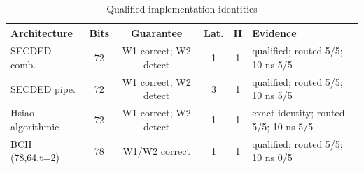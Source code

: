 \begin{table}[t]
\caption{Qualified implementation identities}
\label{tab:identities}
\centering
\scriptsize
\setlength{\tabcolsep}{5.0pt}
\begin{tabular}{@{}lccccp{7.2cm}@{}}
\toprule
Architecture & Bits & Guarantee & Lat. & II & Evidence \\
\midrule
SECDED comb. & 72 & W1 correct; W2 detect & 1 & 1 & qualified; routed 5/5; 10 ns 5/5 \\
SECDED pipe. & 72 & W1 correct; W2 detect & 3 & 1 & qualified; routed 5/5; 10 ns 5/5 \\
Hsiao algorithmic & 72 & W1 correct; W2 detect & 1 & 1 & exact identity; routed 5/5; 10 ns 5/5 \\
BCH (78,64,t=2) & 78 & W1/W2 correct & 1 & 1 & qualified; routed 5/5; 10 ns 0/5 \\
\bottomrule
\end{tabular}
\end{table}
